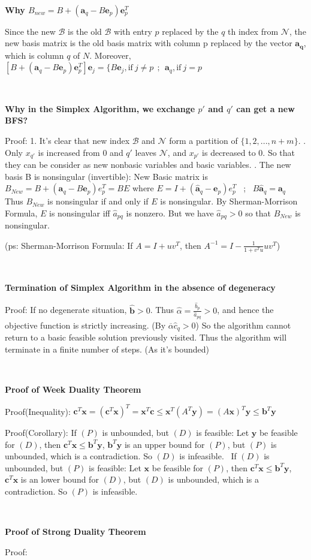 \documentclass[9pt]{article}
\begin{document}
~

\textbf{Why $B_{new}=B+(\mathbf{a}_q-B\mathbf{e}_p)\mathbf{e}_p^T$}

Since the new $\mathcal{B}$ is the old $\mathcal{B}$ with entry $p$ replaced by the $q$ th index from $\mathcal{N}$, the new basis matrix is the old basis matrix with column p replaced by the vector $\mathbf{a_q}$, which is column $q$ of $N$. 
\qquad \qquad Moreover, $[B+(\mathbf{a}_q-B\mathbf{e}_p)\mathbf{e}_p^T]\mathbf{e}_j=\{ B\mathbf{e}_j, \text{if} \ j\ne p \ \ ; \ \ \mathbf{a}_q , \text{if} \ j=p$

~

\textbf{Why in the Simplex Algorithm, we exchange $p'$ and $q'$ can get a new BFS?}

Proof: 1. It's clear that new index $\mathcal{B}$ and $\mathcal{N}$ form a partition of $\{1,2,...,n+m\}$. . Only $x_{q'}$ is increased from 0 and $q'$ leaves $\mathcal{N}$, and $x_{p'}$ is decreased to 0. So that they can be consider as new nonbasic variables and basic variables. . The new basis B is nonsingular (invertible): New Basic matrix is $B_{New}=B+(\mathbf{a}_q-B\mathbf{e}_p)e_p^T=BE$ where $E=I+(\widehat{\mathbf{a}}_q-\mathbf{e}_p)e_p^T$ \ ; \ $B\widehat{\mathbf{a}}_q=\mathbf{a}_q$
Thus $B_{New}$ is nonsingular if and only if $E$ is nonsingular. \quad By {Sherman-Morrison Formula}, $E$ is nonsingular iff $\widehat{a}_{pq}$ is nonzero. But we have $\widehat{a}_{pq}>0$ so that $B_{New}$ is nonsingular.

(ps: Sherman-Morrison Formula: If $A=I+uv^T$, then $A^{-1}=I-\frac{1}{1+v^Tu}uv^T$)

~

\textbf{Termination of Simplex Algorithm in the absence of degeneracy}

Proof: If no degenerate situation, $\widehat{\mathbf{b}}>0$. Thus $\widehat{\alpha}=\frac{\widehat{b}_p}{\widehat{a}_{pq}}>0$, and hence the objective function is strictly increasing. (By $\overline{\alpha}\widehat{c}_q>0$) So the algorithm cannot return to a basic feasible solution previously visited. Thus the algorithm will terminate in a finite number of steps. (As it's bounded)

~

\textbf{Proof of Week Duality Theorem}

Proof(Inequality): $\mathbf{c}^T\mathbf{x}=(\mathbf{c}^T\mathbf{x})^T=\mathbf{x}^T\mathbf{c}\leq\mathbf{x}^T(A^T\mathbf{y})=(A\mathbf{x})^T\mathbf{y}\leq\mathbf{b}^T\mathbf{y}$

Proof(Corollary): If $(P)$ is unbounded, but $(D)$ is feasible: Let $\mathbf{y}$ be feasible for $(D)$, then $\mathbf{c}^T\mathbf{x}\leq\mathbf{b}^T\mathbf{y}$, $\mathbf{b}^T\mathbf{y}$ is an upper bound for $(P)$, but $(P)$ is unbounded, which is a contradiction. So $(D)$ is infeasible.
\quad \ \quad If $(D)$ is unbounded, but $(P)$ is feasible: Let $\mathbf{x}$ be feasible for $(P)$, then $\mathbf{c}^T\mathbf{x}\leq\mathbf{b}^T\mathbf{y}$, $\mathbf{c}^T\mathbf{x}$ is an lower bound for $(D)$, but $(D)$ is unbounded, which is a contradiction. So $(P)$ is infeasible.

~

\textbf{Proof of Strong Duality Theorem}

Proof: 
\end{document}

